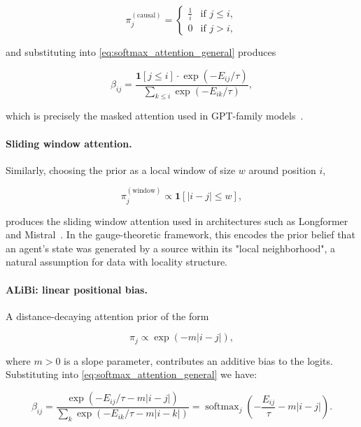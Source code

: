\documentclass[11pt]{article}
\begin{document}
\begin{equation}
\pi_j^{(\text{causal})} = \begin{cases} \frac{1}{i} & \text{if } j \leq i, \\ 0 & \text{if } j > i, \end{cases}
\label{eq:causal_prior}
\end{equation}

and substituting into \eqref{eq:softmax_attention_general} produces

\begin{equation}
\beta_{ij} = \frac{\mathbf{1}[j \leq i] \cdot \exp(-E_{ij}/\tau)}{\sum_{k \leq i} \exp(-E_{ik}/\tau)},
\label{eq:causal_attention}
\end{equation}

which is precisely the masked attention used in GPT-family models~\cite{radford2019language}.

\paragraph{Sliding window attention.}
Similarly, choosing the prior as a local window of size $w$ around position $i$,

\begin{equation}
\pi_j^{(\text{window})} \propto \mathbf{1}[|i - j| \leq w],
\label{eq:window_prior}
\end{equation}

produces the sliding window attention used in architectures such as Longformer~\cite{beltagy2020longformer} and Mistral~\cite{jiang2023mistral}. In the gauge-theoretic framework, this encodes the prior belief that an agent's state was generated by a source within its "local neighborhood", a natural assumption for data with locality structure.

\paragraph{ALiBi: linear positional bias.}
A distance-decaying attention prior of the form

\begin{equation}
\pi_j \propto \exp(-m|i - j|),
\label{eq:alibi_prior}
\end{equation}

where $m > 0$ is a slope parameter, contributes an additive bias to the logits. Substituting into \eqref{eq:softmax_attention_general} we have:

\begin{equation}
\beta_{ij} = \frac{\exp(-E_{ij}/\tau - m|i-j|)}{\sum_k \exp(-E_{ik}/\tau - m|i-k|)} = \operatorname{softmax}_j\left(-\frac{E_{ij}}{\tau} - m|i - j|\right).
\label{eq:alibi_attention}
\end{equation}
\end{document}
